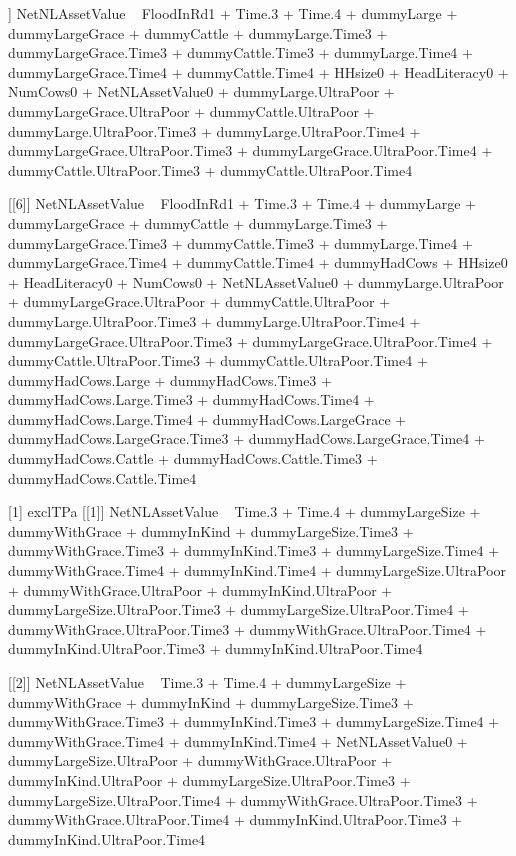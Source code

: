 \begin{Schunk}
\begin{Soutput}
[[5]]
NetNLAssetValue ~ FloodInRd1 + Time.3 + Time.4 + dummyLarge + 
    dummyLargeGrace + dummyCattle + dummyLarge.Time3 + dummyLargeGrace.Time3 + 
    dummyCattle.Time3 + dummyLarge.Time4 + dummyLargeGrace.Time4 + 
    dummyCattle.Time4 + HHsize0 + HeadLiteracy0 + NumCows0 + 
    NetNLAssetValue0 + dummyLarge.UltraPoor + dummyLargeGrace.UltraPoor + 
    dummyCattle.UltraPoor + dummyLarge.UltraPoor.Time3 + dummyLarge.UltraPoor.Time4 + 
    dummyLargeGrace.UltraPoor.Time3 + dummyLargeGrace.UltraPoor.Time4 + 
    dummyCattle.UltraPoor.Time3 + dummyCattle.UltraPoor.Time4

[[6]]
NetNLAssetValue ~ FloodInRd1 + Time.3 + Time.4 + dummyLarge + 
    dummyLargeGrace + dummyCattle + dummyLarge.Time3 + dummyLargeGrace.Time3 + 
    dummyCattle.Time3 + dummyLarge.Time4 + dummyLargeGrace.Time4 + 
    dummyCattle.Time4 + dummyHadCows + HHsize0 + HeadLiteracy0 + 
    NumCows0 + NetNLAssetValue0 + dummyLarge.UltraPoor + dummyLargeGrace.UltraPoor + 
    dummyCattle.UltraPoor + dummyLarge.UltraPoor.Time3 + dummyLarge.UltraPoor.Time4 + 
    dummyLargeGrace.UltraPoor.Time3 + dummyLargeGrace.UltraPoor.Time4 + 
    dummyCattle.UltraPoor.Time3 + dummyCattle.UltraPoor.Time4 + 
    dummyHadCows.Large + dummyHadCows.Time3 + dummyHadCows.Large.Time3 + 
    dummyHadCows.Time4 + dummyHadCows.Large.Time4 + dummyHadCows.LargeGrace + 
    dummyHadCows.LargeGrace.Time3 + dummyHadCows.LargeGrace.Time4 + 
    dummyHadCows.Cattle + dummyHadCows.Cattle.Time3 + dummyHadCows.Cattle.Time4

[1] exclTPa
[[1]]
NetNLAssetValue ~ Time.3 + Time.4 + dummyLargeSize + dummyWithGrace + 
    dummyInKind + dummyLargeSize.Time3 + dummyWithGrace.Time3 + 
    dummyInKind.Time3 + dummyLargeSize.Time4 + dummyWithGrace.Time4 + 
    dummyInKind.Time4 + dummyLargeSize.UltraPoor + dummyWithGrace.UltraPoor + 
    dummyInKind.UltraPoor + dummyLargeSize.UltraPoor.Time3 + 
    dummyLargeSize.UltraPoor.Time4 + dummyWithGrace.UltraPoor.Time3 + 
    dummyWithGrace.UltraPoor.Time4 + dummyInKind.UltraPoor.Time3 + 
    dummyInKind.UltraPoor.Time4

[[2]]
NetNLAssetValue ~ Time.3 + Time.4 + dummyLargeSize + dummyWithGrace + 
    dummyInKind + dummyLargeSize.Time3 + dummyWithGrace.Time3 + 
    dummyInKind.Time3 + dummyLargeSize.Time4 + dummyWithGrace.Time4 + 
    dummyInKind.Time4 + NetNLAssetValue0 + dummyLargeSize.UltraPoor + 
    dummyWithGrace.UltraPoor + dummyInKind.UltraPoor + dummyLargeSize.UltraPoor.Time3 + 
    dummyLargeSize.UltraPoor.Time4 + dummyWithGrace.UltraPoor.Time3 + 
    dummyWithGrace.UltraPoor.Time4 + dummyInKind.UltraPoor.Time3 + 
    dummyInKind.UltraPoor.Time4


\end{Soutput}
\end{Schunk}
